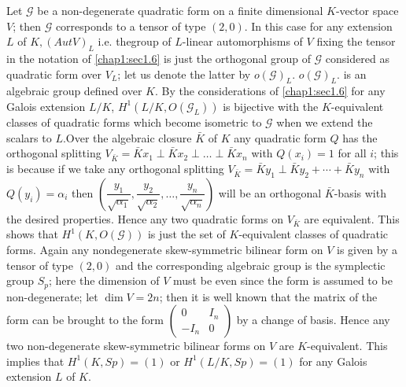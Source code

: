 \begin{exam}\label{chap1:exam3}
Let $\mathscr{G}$ be a non-degenerate quadratic form on a finite
dimensional $K$-vector space $V$; then $\mathscr{G}$ corresponds to a
tensor of type $(2,0)$. In this case for any extension $L$ of $	K,
(Aut V)_{L}$ i.e. the\pageoriginale group of $L$-linear automorphisms
of $V$ fixing 
the tensor in the notation of \ref{chap1:sec1.6} is just the orthogonal group of
$\mathscr{G}$ considered as quadratic form over $V_{L}$; let us denote
the  latter by $o (\mathscr{G})_{L}$. $o (\mathscr{G})_{L}$.  is an
algebraic group defined over $K$. By the considerations of \ref{chap1:sec1.6} for
any Galois extension $L/K$, $H^1 (L/K,O (\mathscr{G}_{L}))$ is bijective
with the $K$-equivalent classes of quadratic forms which become
isometric to $\mathscr{G}$  when we extend the scalars to $L$.Over the
algebraic closure $\bar{K}$ of  $K$ any quadratic form $Q$ has the
orthogonal splitting $V_{\bar{K}} = \bar{K}x_1 \perp \bar{K}x_2 \perp
\ldots  \perp \bar{K}x_{n}$ with $Q (x_i) = 1$ for all $i$; this is
because  if we take any orthogonal splitting $V_{\bar{K}} = \bar{K}y_1
\perp \bar{K} y_2 + \cdots +  \bar{K} y_{n}$ with $Q(y_i) =
\alpha_i$ then $(\dfrac{y_1}{\sqrt{\alpha_1}},
\dfrac{y_2}{\sqrt{\alpha_2}},\ldots, \dfrac{y_n}{\sqrt{\alpha_n}})$
will be an orthogonal $\bar{K}$-basis with the desired
properties. Hence any two quadratic forms on $V_{\bar{K}}$ are
equivalent. This shows that $H^1 (K,O (\mathscr{G}))$  is just the set
of $K$-equivalent classes of quadratic forms. Again any nondegenerate
skew-symmetric bilinear form on $V$ is given by a tensor of type
$(2,0)$ and the corresponding algebraic group is the symplectic  group
$S_{p}$; here the dimension of $V$ must be even since the form is
assumed to be non-degenerate; let $\dim V = 2n$; then it is well known
that the matrix of the form can be brought to the form
$\begin{pmatrix}0 &I_n\\-I_n&0 \end{pmatrix}$ by a change  of
basis. Hence any two non-degenerate skew-symmetric bilinear forms on
$V$ are $K$-equivalent. This implies that $H^1 (K,Sp) = (1)$ or  $H^1
(L/K,Sp) = (1)$ for any Galois extension $L$ of $K$. 
\end{exam}

